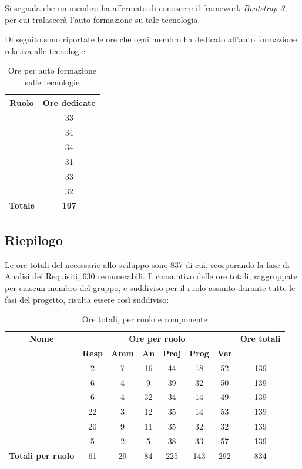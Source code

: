Si segnala che un membro ha affermato di conoscere il framework \textit{Bootstrap 3}, per cui tralascerà l'auto formazione su tale tecnologia.

Di seguito sono riportate le ore che ogni membro ha dedicato all'auto formazione relativa alle tecnologie:

\begin{table}[H]
	\begin{center}
		\begin{tabular}{|c|c|}
			\hline
			\textbf{Ruolo}	& \textbf{Ore dedicate}  \\
			\hline
			\MC	&	33		\\
			\hline
			\DAN	&	34	\\
			\hline
			\AN	&	34		\\
			\hline
			\AS	&	31		\\
			\hline
			\NS	&	33		\\
			\hline
			\DS	&	32		\\
			\hline
			\textbf{Totale} & \textbf{197}  \\
			\hline
		\end{tabular}
	\end{center}
	\caption{Ore per auto formazione sulle tecnologie}
\end{table}


\subsection{Riepilogo}
Le ore totali del necessarie allo sviluppo sono 837 di cui, scorporando la fase di Analisi dei Requisiti, 630 remunerabili. Il consuntivo delle ore totali, raggruppate per ciascun membro del gruppo, e suddiviso per il ruolo assunto durante tutte le fasi del progetto, risulta essere così suddiviso:

\begin{table}[H]
	\begin{center}
		\begin{tabular}{|c|c|c|c|c|c|c|c|}
			\hline
			\textbf{Nome} & \multicolumn{6}{c|}{\textbf{Ore per ruolo}} & \textbf{Ore totali} \\\cline{2-7}
			& \textbf{Resp} & \textbf{Amm} & \textbf{An} & \textbf{Proj} & \textbf{Prog} & \textbf{Ver} & \\
			\hline
			\MC			&	2	&	7	&	16	&	44	&	18	&	52	&	139	\\
			\hline
			\AN			&	6	&	4	&	9	&	39	&	32	&	50	& 	139	\\
			\hline
			\DAN		&	6	&	4	&	32	&	34	&	14	&	49	&	139	\\
			\hline
			\AS			&	22	&	3 	&	12 	&	35	&	14 	& 	53	&	139	\\
			\hline
			\NS 		&	20	&	9	&	11	&	35	&	32	& 	32	&	139	\\
			\hline
			\DS			& 	5	&	2	&	5	&	38	&	33	&	57	&	139	\\
			\hline
			\textbf{Totali per ruolo}	& 	61	&	29	&	84	&  225	&	143	&	292	&	834	\\
			\hline
		\end{tabular}
	\end{center}
	\caption{Ore totali, per ruolo e componente}
\end{table}

